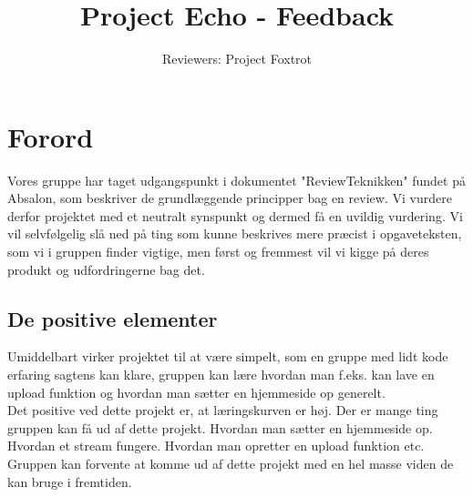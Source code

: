\documentclass[a4paper]{article}
\title{Project Echo - Feedback}
\author{Reviewers: Project Foxtrot}
\begin{document}
\maketitle
\section{Forord}
Vores gruppe har taget udgangspunkt i dokumentet "ReviewTeknikken" fundet på Absalon, som beskriver de grundlæggende principper bag en review. Vi vurdere derfor projektet med et neutralt synspunkt og dermed få en uvildig vurdering. 
Vi vil selvfølgelig slå ned på ting som kunne beskrives mere præcist i opgaveteksten, som vi i gruppen finder vigtige, men først og fremmest vil vi kigge på deres produkt og udfordringerne bag det.
\subsection{De positive elementer}
Umiddelbart virker projektet til at være simpelt, som en gruppe med lidt kode erfaring sagtens kan klare, gruppen kan lære hvordan man f.eks. kan lave en upload funktion og hvordan man sætter en hjemmeside op generelt. \\

Det positive ved dette projekt er, at læringskurven er høj. Der er mange ting gruppen kan få ud af dette projekt. Hvordan man sætter en hjemmeside op. Hvordan et stream fungere. Hvordan man opretter en upload funktion etc. Gruppen kan forvente at komme ud af dette projekt med en hel masse viden de kan bruge i fremtiden.
\end{document}
